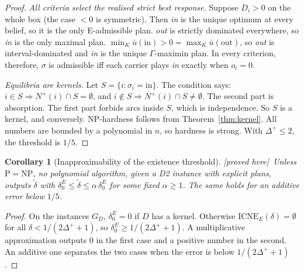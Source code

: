 \documentclass[11pt]{article}
\newtheorem{corollary}[theorem]{Corollary}
\theoremstyle{definition}
\theoremstyle{remark}
\newcommand{\ub}{\bar u}
\newcommand{\ICNE}{\mathrm{ICNE}}
\newcommand{\PROVED}{\textsf{[proved here]}}
\begin{document}
\begin{proof}
\emph{All criteria select the realised strict best response.} Suppose $D_i>0$ on the whole box (the case $<0$ is symmetric). Then \emph{in} is the unique optimum at every belief, so it is the only E-admissible plan. \emph{out} is strictly dominated everywhere, so \emph{in} is the only maximal plan. $\min_K\ub(\text{in})>0=\max_K\ub(\text{out})$, so \emph{out} is interval-dominated and \emph{in} is the unique $\Gamma$-maximin plan. In every criterion, therefore, $\sigma$ is admissible iff each carrier plays \emph{in} exactly when $o_i=0$.

\emph{Equilibria are kernels.} Let $S=\{i:\sigma_i=\text{in}\}$. The condition says: $i\in S\Rightarrow N^+(i)\cap S=\emptyset$, and $i\notin S\Rightarrow N^+(i)\cap S\neq\emptyset$. The second part is absorption. The first part forbids arcs inside $S$, which is independence. So $S$ is a kernel, and conversely. NP-hardness follows from Theorem~\ref{thm:kernel}. All numbers are bounded by a polynomial in $n$, so hardness is strong. With $\Delta^+\le2$, the threshold is $1/5$.
\end{proof}

\begin{corollary}[Inapproximability of the existence threshold]\label{cor:inapprox} \PROVED\
Unless $\mathrm{P}=\mathrm{NP}$, no polynomial algorithm, given a D2 instance with explicit plans, outputs $\tilde\delta$ with $\delta_0^E\le\tilde\delta\le\alpha\,\delta^E_0$ for some fixed $\alpha\ge1$. The same holds for an additive error below $1/5$.
\end{corollary}
\begin{proof}
On the instances $G_D$, $\delta_0^E=0$ if $D$ has a kernel. Otherwise $\ICNE_E(\delta)=\emptyset$ for all $\delta<1/(2\Delta^++1)$, so $\delta_0^E\ge1/(2\Delta^++1)$. A multiplicative approximation outputs $0$ in the first case and a positive number in the second. An additive one separates the two cases when the error is below $1/(2\Delta^++1)$.
\end{proof}
\end{document}
